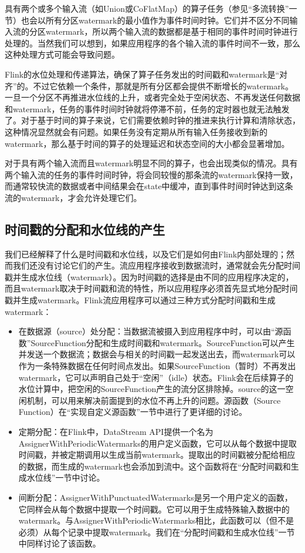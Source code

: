 \documentclass[cn,11pt,chinese]{elegantbook}
\begin{document}
具有两个或多个输入流（如Union或CoFlatMap）的算子任务（参见“多流转换”一节）也会以所有分区watermark的最小值作为事件时间时钟。它们并不区分不同输入流的分区watermark，所以两个输入流的数据都是基于相同的事件时间时钟进行处理的。当然我们可以想到，如果应用程序的各个输入流的事件时间不一致，那么这种处理方式可能会导致问题。

Flink的水位处理和传递算法，确保了算子任务发出的时间戳和watermark是“对齐”的。不过它依赖一个条件，那就是所有分区都会提供不断增长的watermark。一旦一个分区不再推进水位线的上升，或者完全处于空闲状态、不再发送任何数据和watermark，任务的事件时间时钟就将停滞不前，任务的定时器也就无法触发了。对于基于时间的算子来说，它们需要依赖时钟的推进来执行计算和清除状态，这种情况显然就会有问题。如果任务没有定期从所有输入任务接收到新的watermark，那么基于时间的算子的处理延迟和状态空间的大小都会显著增加。

对于具有两个输入流而且watermark明显不同的算子，也会出现类似的情况。具有两个输入流的任务的事件时间时钟，将会同较慢的那条流的watermark保持一致，而通常较快流的数据或者中间结果会在state中缓冲，直到事件时间时钟达到这条流的watermark，才会允许处理它们。

\subsection{时间戳的分配和水位线的产生}

我们已经解释了什么是时间戳和水位线，以及它们是如何由Flink内部处理的；然而我们还没有讨论它们的产生。流应用程序接收到数据流时，通常就会先分配时间戳并生成水位线（watermark）。因为时间戳的选择是由不同的应用程序决定的，而且watermark取决于时间戳和流的特性，所以应用程序必须首先显式地分配时间戳并生成watermark。Flink流应用程序可以通过三种方式分配时间戳和生成watermark：

\begin{itemize}
    \item 在数据源（source）处分配：当数据流被摄入到应用程序中时，可以由“源函数”SourceFunction分配和生成时间戳和watermark。SourceFunction可以产生并发送一个数据流；数据会与相关的时间戳一起发送出去，而watermark可以作为一条特殊数据在任何时间点发出。如果SourceFunction（暂时）不再发出watermark，它可以声明自己处于“空闲”（idle）状态。Flink会在后续算子的水位计算中，把空闲的SourceFunction产生的流分区排除掉。source的这一空闲机制，可以用来解决前面提到的水位不再上升的问题。源函数（Source Function）在“实现自定义源函数”一节中进行了更详细的讨论。
    \item 定期分配：在Flink中，DataStream API提供一个名为AssignerWithPeriodicWatermarks的用户定义函数，它可以从每个数据中提取时间戳，并被定期调用以生成当前watermark。提取出的时间戳被分配给相应的数据，而生成的watermark也会添加到流中。这个函数将在“分配时间戳和生成水位线”一节中讨论。
    \item 间断分配：AssignerWithPunctuatedWatermarks是另一个用户定义的函数，它同样会从每个数据中提取一个时间戳。它可以用于生成特殊输入数据中的watermark。与AssignerWithPeriodicWatermarks相比，此函数可以（但不是必须）从每个记录中提取watermark。我们在“分配时间戳和生成水位线”一节中同样讨论了该函数。
\end{itemize}
\end{document}
